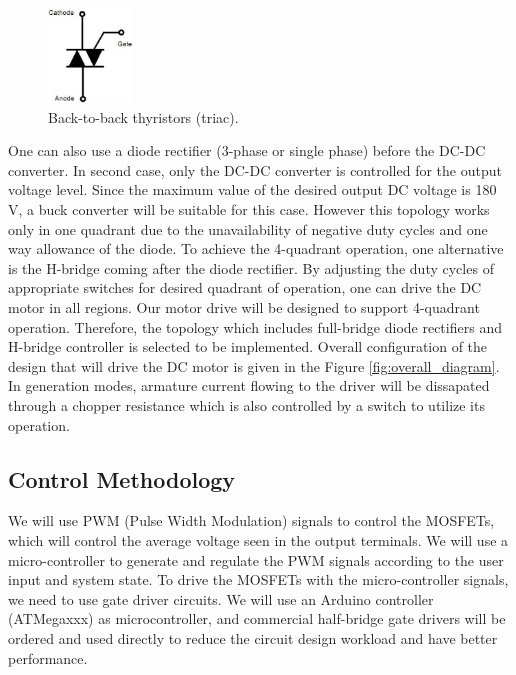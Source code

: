 \begin{figure}[H]
    \centering
    \includegraphics[width=0.2\textwidth]{Figures/triac_symbol.png}
    \caption{Back-to-back thyristors (triac).}
    \label{fig:triac}
\end{figure}

One can also use a diode rectifier (3-phase or single phase) before the DC-DC converter. In second case, only the DC-DC converter is controlled for the output voltage level. Since the maximum value of the desired output DC voltage is 180 V, a buck converter will be suitable for this case. However this topology works only in one quadrant due to the unavailability of negative duty cycles and one way allowance of the diode. To achieve the 4-quadrant operation, one alternative is the H-bridge coming after the diode rectifier. By adjusting the duty cycles of appropriate switches for desired quadrant of operation, one can drive the DC motor in all regions. Our motor drive will be designed to support 4-quadrant operation. Therefore, the topology which includes full-bridge diode rectifiers and H-bridge controller is selected to be implemented. Overall configuration of the design that will drive the DC motor is given in the Figure \ref{fig:overall_diagram}. In generation modes, armature current flowing to the driver will be dissapated through a chopper resistance which is also controlled by a switch to utilize its operation. \\


\subsection{Control Methodology}
We will use PWM (Pulse Width Modulation) signals to control the MOSFETs, which will control the average voltage seen in the output terminals. We will use a micro-controller to generate and regulate the PWM signals according to the user input and system state. To drive the MOSFETs with the micro-controller signals, we need to use gate driver circuits. We will use an Arduino controller (ATMegaxxx) as microcontroller, and commercial half-bridge gate drivers will be ordered and used directly to reduce the circuit design workload and have better performance. \\

